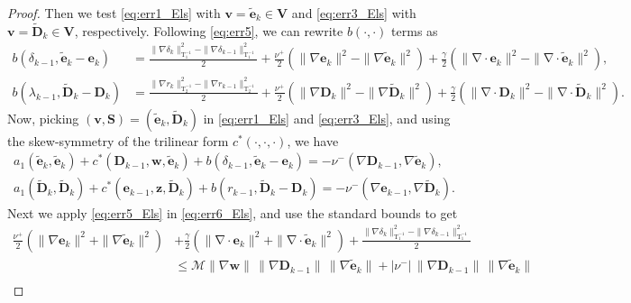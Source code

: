 \documentclass[3p]{elsarticle}
\def\nuplus{\nu^{+}}
\def\numinus{\nu^{-}}
\def\V#1{\mathbf{#1}}
\def\Vt#1{\mathbf{\tilde{#1}}}
\newcommand{\Mbd}{\mathcal{M}}
\newcommand{\divergence}{\mathrm{\nabla \cdot}}
\newcommand{\Luinvmap}{\mathrm{T_1^{-1}}}
\newcommand{\Lbinvmap}{\mathrm{T_2^{-1}}}
\begin{document}
\begin{proof}
Then we test \eqref{eq:err1_Els} with $\V{v} = \Vt{e}_k \in \V{V}$ and \eqref{eq:err3_Els} with $\V{v} = \Vt{D}_k \in \V{V}$, respectively. Following \eqref{eq:err5}, we can rewrite $b(\cdot, \cdot)$ terms as 
\begin{equation}
    \label{eq:err5_Els}
    \begin{aligned}        
b(\delta_{k-1}, \Vt{e}_k - \V{e}_k) & = \frac{\|\nabla \delta_{k} \|^2_{\Luinvmap} - \|\nabla \delta_{k-1} \|^2_{\Luinvmap}}{2} +
\frac{\nuplus}{2} \left( \|\nabla \V{e}_{k} \|^2 - \|\nabla \Vt{e}_{k} \|^2 \right) + 
\frac{\gamma}{2} \left( \|\divergence \V{e}_{k} \|^2 - \|\divergence \Vt{e}_{k} \|^2\right), \\
b(\lambda_{k-1}, \Vt{D}_k - \V{D}_k) & = \frac{\|\nabla r_{k} \|^2_{\Lbinvmap} - \|\nabla r_{k-1} \|^2_{\Lbinvmap}}{2} + \frac{\nuplus}{2}\left( \|\nabla \V{D}_{k} \|^2 - \|\nabla \Vt{D}_{k} \|^2 \right) + 
\frac{\gamma}{2} \left( \|\divergence \V{D}_{k} \|^2 - \|\divergence \Vt{D}_{k} \|^2\right).
    \end{aligned}
\end{equation}
Now, picking $(\V{v},\V{S})=(\Vt{e}_k,\Vt{D}_k)$ in \eqref{eq:err1_Els} and \eqref{eq:err3_Els}, and using the skew-symmetry of the trilinear form $c^*(\cdot,\cdot,\cdot)$, we have
\begin{equation}\label{eq:err6_Els}
\begin{aligned}  
a_1(\Vt{e}_{k},\Vt{e}_{k})
+ c^*(\V{D}_{k-1}, \V{w}, \Vt{e}_{k})
+ b(\delta_{k-1},\Vt{e}_{k}-\V{e}_k) = 
- \numinus(\nabla \V{D}_{k-1},\nabla\Vt{e}_{k}), \\
a_1(\Vt{D}_{k},\Vt{D}_{k})
+  c^*(\V{e}_{k-1}, \V{z}, \Vt{D}_{k})
+  b(r_{k-1},\Vt{D}_{k}-\V{D}_{k}) = 
-\numinus (\nabla \V{e}_{k-1},\nabla \Vt{D}_{k}).
\end{aligned}
\end{equation}
Next we apply \eqref{eq:err5_Els} in \eqref{eq:err6_Els}, and use the standard bounds to get
\begin{equation}\label{eq:err7_Els}
\begin{aligned} 
\frac{\nuplus}{2} \left( \|\nabla \V{e}_{k} \|^2 + \|\nabla \Vt{e}_{k} \|^2 \right) & + 
\frac{\gamma}{2} \left( \|\divergence \V{e}_{k} \|^2 + \|\divergence \Vt{e}_{k} \|^2\right) + \frac{\|\nabla \delta_{k} \|^2_{\Luinvmap} - \|\nabla \delta_{k-1} \|^2_{\Luinvmap}}{2} \\ 
& \le \Mbd \|\nabla \V{w} \|\, \|\nabla \V{D}_{k-1} \|\, \|\nabla \Vt{e}_{k} \| + |\numinus|\, \|\nabla \V{D}_{k-1} \|\, \|\nabla \Vt{e}_{k} \| \\

\end{aligned}
\end{equation}
\end{proof}
\end{document}
